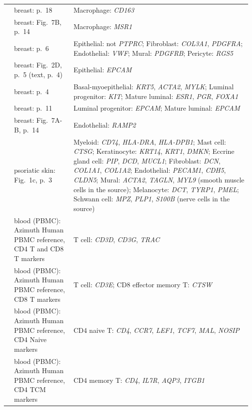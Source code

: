 \begin{longtable}{@{}>{\raggedright\arraybackslash}p{2.0cm} >{\raggedright\arraybackslash}p{4.6cm} >{\raggedright\arraybackslash}p{8.4cm}@{}}
\cite{palSinglecellRNAExpression2021} & breast: p.~18 & Macrophage: \textit{CD163} \\
\cite{palSinglecellRNAExpression2021} & breast: Fig.~7B, p.~14 & Macrophage: \textit{MSR1} \\
\cite{palSinglecellRNAExpression2021} & breast: p.~6 & Epithelial: not \textit{PTPRC}; Fibroblast: \textit{COL3A1}, \textit{PDGFRA}; Endothelial: \textit{VWF}; Mural: \textit{PDGFRB}; Pericyte: \textit{RGS5} \\
\cite{palSinglecellRNAExpression2021} & breast: Fig.~2D, p.~5 (text, p.~4) & Epithelial: \textit{EPCAM} \\
\cite{palSinglecellRNAExpression2021} & breast: p.~4 & Basal-myoepithelial: \textit{KRT5}, \textit{ACTA2}, \textit{MYLK}; Luminal progenitor: \textit{KIT}; Mature luminal: \textit{ESR1}, \textit{PGR}, \textit{FOXA1} \\
\cite{palSinglecellRNAExpression2021} & breast: p.~11 & Luminal progenitor: \textit{EPCAM}; Mature luminal: \textit{EPCAM} \\
\cite{palSinglecellRNAExpression2021} & breast: Fig.~7A-B, p.~14 & Endothelial: \textit{RAMP2} \\
\cite{maSingleCellSpatial2023} & psoriatic skin: Fig.~1c, p.~3 & Myeloid: \textit{CD74}, \textit{HLA-DRA}, \textit{HLA-DPB1}; Mast cell: \textit{CTSG}; Keratinocyte: \textit{KRT14}, \textit{KRT1}, \textit{DMKN}; Eccrine gland cell: \textit{PIP}, \textit{DCD}, \textit{MUCL1}; Fibroblast: \textit{DCN}, \textit{COL1A1}, \textit{COL1A2}; Endothelial: \textit{PECAM1}, \textit{CDH5}, \textit{CLDN5}; Mural: \textit{ACTA2}, \textit{TAGLN}, \textit{MYL9} (smooth muscle cells in the source); Melanocyte: \textit{DCT}, \textit{TYRP1}, \textit{PMEL}; Schwann cell: \textit{MPZ}, \textit{PLP1}, \textit{S100B} (nerve cells in the source) \\
\cite{haoIntegratedAnalysisMultimodal2021} & blood (PBMC): Azimuth Human PBMC reference, CD4 T and CD8 T markers & T cell: \textit{CD3D}, \textit{CD3G}, \textit{TRAC} \\
\cite{haoIntegratedAnalysisMultimodal2021} & blood (PBMC): Azimuth Human PBMC reference, CD8 T markers & T cell: \textit{CD3E}; CD8 effector memory T: \textit{CTSW} \\
\cite{haoIntegratedAnalysisMultimodal2021} & blood (PBMC): Azimuth Human PBMC reference, CD4 Naive markers & CD4 naive T: \textit{CD4}, \textit{CCR7}, \textit{LEF1}, \textit{TCF7}, \textit{MAL}, \textit{NOSIP} \\
\cite{haoIntegratedAnalysisMultimodal2021} & blood (PBMC): Azimuth Human PBMC reference, CD4 TCM markers & CD4 memory T: \textit{CD4}, \textit{IL7R}, \textit{AQP3}, \textit{ITGB1} \\

\end{longtable}
